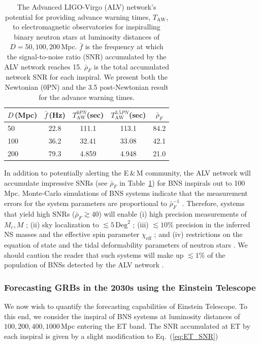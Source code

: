 \documentclass[11pt,a4paper]{article}
\newcommand\T{\rule{0pt}{2.6ex}}       %
\newcommand\B{\rule[-1.2ex]{0pt}{0pt}} %
\begin{document}
\begin{table}[h]
\centering
\begin{tabular}{lcccc}
\hline
$D\,$(Mpc) & $\bar{f}\,$(Hz) & $T^{0PN}_\text{AW}$(sec) & $T^{3.5PN}_\text{AW}$(sec)& $\bar{\rho}_F$\T\B\\
\hline
50 & 22.8 &111.1 & 113.1 & 84.2 \T\\
100 & 36.2 & 32.41 & 33.08 & 42.1 \\
200 & 79.3 & 4.859 & 4.948 & 21.0 \\
\hline
\end{tabular}
\caption{The Advanced LIGO-Virgo (ALV) network's potential for providing advance warning times, $T_\text{AW}$, 
to electromagnetic observatories for inspiralling binary neutron stars at luminosity distances of $D=50,100,200\,$Mpc. 
$\bar{f}$ is the frequency at which the  signal-to-noise ratio (SNR) accumulated by the ALV network reaches 15. 
$\bar{\rho}_F$ is the total accumulated network SNR for each inspiral. We present both the Newtonian (0PN) 
and the 3.5 post-Newtonian result for the advance warning times.}\label{table:LIGO2020}
\end{table}
%

In addition to potentially alerting the E\,\&\,M community, the ALV network will accumulate impressive SNRs 
(see $\bar{\rho}_F$ in Table~\ref{table:LIGO2020}) for BNS inspirals out to 100\,Mpc.
Monte-Carlo simulations of BNS systems indicate that the measurement errors for the system parameters are proportional to $\bar\rho^{-1}_F$ \cite{Cutler:1994ys}.
Therefore, systems that yield high SNRs ($\bar\rho_F\gtrsim 40$) will enable (i) high precision measurements of 
$M_c, M$ \cite{Farr:2015lna}; (ii) sky localization to $\lesssim 5\,\text{Deg}^2$ \cite{Rodriguez:2013oaa};
(iii) $ \lesssim 10\%$ precision in the inferred NS masses \cite{Rodriguez:2013oaa} and the effective spin parameter $\chi_\text{eff}$ \cite{Zhu:2017znf}; and
(iv) restrictions on the equation of state and the tidal deformability
parameters of neutron stars \cite{Read:2009yp, Andersson:2009yt, PhysRevD.89.103012, PhysRevD.91.043002}.
We should caution the reader that such systems will make up $\lesssim 1\%$ of the population of BNSs detected by 
the ALV network \cite{Sathyaprakash:2012jk}.

\subsubsection{Forecasting GRBs in the 2030s using the Einstein Telescope}\label{Sec:ETB}
We now wish to quantify the forecasting capabilities of Einstein Telescope. To this end, we consider the inspiral of BNS systems
at luminosity distances of $100,200,400,1000\,$Mpc entering the ET band. The SNR accumulated at ET by each inspiral is given
by a slight modification to Eq.~(\ref{eq:ET_SNR})
\end{document}
